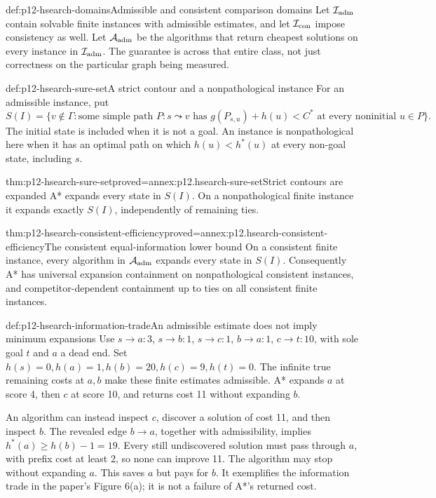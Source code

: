 \begin{hbdefinition}{def:p12-hsearch-domains}{Admissible and consistent comparison domains}
Let \(\mathcal I_{\rm adm}\) contain solvable finite instances with
admissible estimates, and let \(\mathcal I_{\rm con}\) impose
consistency as well. Let \(\mathcal A_{\rm adm}\) be the algorithms
that return cheapest solutions on every instance in
\(\mathcal I_{\rm adm}\). The guarantee is across that entire class,
not just correctness on the particular graph being measured.
\end{hbdefinition}

\begin{hbdefinition}{def:p12-hsearch-sure-set}{A strict contour and a nonpathological instance}
For an admissible instance, put
\[
 S(I)=\{v\notin\Gamma:\text{some simple path }P:s\leadsto v
 \text{ has }g(P_{s,u})+h(u)<C^*
 \text{ at every noninitial }u\in P\}.
\]
The initial state is included when it is not a goal. An instance is
nonpathological here when it has an optimal path on which
\(h(u)<h^*(u)\) at every non-goal state, including \(s\).
\end{hbdefinition}

\begin{hbtheorem}{thm:p12-hsearch-sure-set}{proved=annex:p12.hsearch-sure-set}{Strict contours are expanded}
A* expands every state in \(S(I)\). On a nonpathological finite
instance it expands exactly \(S(I)\), independently of remaining ties.
\end{hbtheorem}

\begin{hbtheorem}{thm:p12-hsearch-consistent-efficiency}{proved=annex:p12.hsearch-consistent-efficiency}{The consistent equal-information lower bound}
On a consistent finite instance, every algorithm in
\(\mathcal A_{\rm adm}\) expands every state in \(S(I)\).
Consequently A* has universal expansion containment on nonpathological
consistent instances, and competitor-dependent containment up to ties on
all consistent finite instances.
\end{hbtheorem}

\begin{hbexample}{def:p12-hsearch-information-trade}{An admissible estimate does not imply minimum expansions}
Use \(s\to a:3\), \(s\to b:1\), \(s\to c:1\),
\(b\to a:1\), \(c\to t:10\), with sole goal \(t\) and
\(a\) a dead end. Set \(h(s)=0,h(a)=1,h(b)=20,h(c)=9,h(t)=0\).
The infinite true remaining costs at \(a,b\) make these finite
estimates admissible. A* expands \(a\) at score 4, then \(c\) at
score 10, and returns cost 11 without expanding \(b\).

An algorithm can instead inspect \(c\), discover a solution of cost
11, and then inspect \(b\). The revealed edge \(b\to a\), together
with admissibility, implies
\(h^*(a)\ge h(b)-1=19\). Every still undiscovered solution must pass
through \(a\), with prefix cost at least 2, so none can improve 11.
The algorithm may stop without expanding \(a\). This saves \(a\)
but pays for \(b\). It exemplifies the information trade in the
paper's Figure 6(a); it is not a failure of A*'s returned cost.
\end{hbexample}

